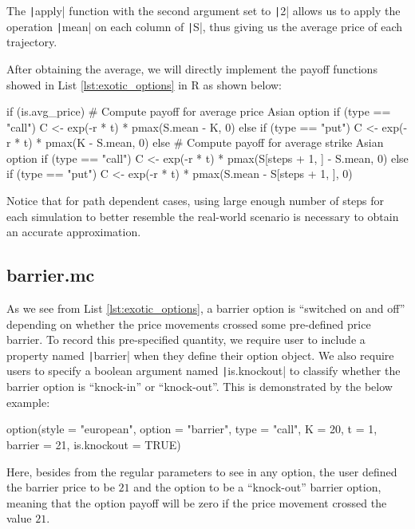 The \texttt|apply| function with the second argument set to \texttt|2| allows us to apply the operation \texttt|mean| on each column of \texttt|S|, thus giving us the average price of each trajectory.

After obtaining the average, we will directly implement the payoff functions showed in List \ref{lst:exotic_options} in R as shown below:

\begin{Rminted}
if (is.avg_price) { # Compute payoff for average price Asian option
    if (type == "call") {
        C <- exp(-r * t) * pmax(S.mean - K, 0)
    } else if (type == "put") {
        C <- exp(-r * t) * pmax(K - S.mean, 0)
    }
} else { # Compute payoff for average strike Asian option
    if (type == "call") {
        C <- exp(-r * t) * pmax(S[steps + 1, ] - S.mean, 0)
    } else if (type == "put") {
        C <- exp(-r * t) * pmax(S.mean - S[steps + 1, ], 0)
    }
}
\end{Rminted}

Notice that for path dependent cases, using large enough number of steps for each simulation to better resemble the real-world scenario is necessary to obtain an accurate approximation.

\subsection{barrier.mc}

As we see from List \ref{lst:exotic_options}, a barrier option is ``switched on and off'' depending on whether the price movements crossed some pre-defined price barrier. To record this pre-specified quantity, we require user to include a property named \texttt|barrier| when they define their option object. We also require users to specify a boolean argument named \texttt|is.knockout| to classify whether the barrier option is ``knock-in'' or ``knock-out''. This is demonstrated by the below example:

\begin{Rminted}
option(style = "european", option = "barrier", type = "call", K = 20, t = 1, barrier = 21, is.knockout = TRUE)
\end{Rminted}

Here, besides from the regular parameters to see in any option, the user defined the barrier price to be $21$ and the option to be a ``knock-out'' barrier option, meaning that the option payoff will be zero if the price movement crossed the value $21$.

